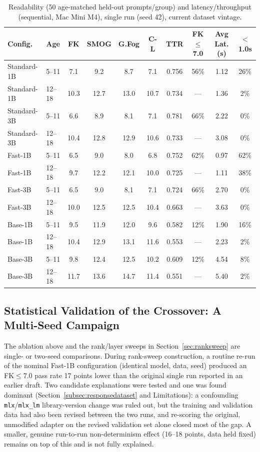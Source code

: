\documentclass[pdflatex,sn-mathphys-num]{sn-jnl}%
\begin{document}
\begin{table}[!h]
  \caption{Readability (50 age-matched held-out prompts/group) and latency/throughput (sequential, Mac Mini M4), single run (seed 42), current dataset vintage.}
  \label{tab:res2}
  \scriptsize
  \setlength{\tabcolsep}{3pt}
  \begin{tabular}{@{}llcccccccc@{}}
    \toprule
    Config. & Age & FK & SMOG & G.Fog & C-L & TTR & FK$\leq$7.0 & Avg Lat.(s) & $<$1.0s \\
    \midrule
    Standard-1B & 5--11  & 7.1  & 9.2  & 8.7  & 7.1  & 0.756 & 56\% & 1.12 & 26\% \\
    Standard-1B & 12--18 & 10.3 & 12.7 & 13.0 & 10.7 & 0.734 & ---  & 1.36 & 2\%  \\
    Standard-3B & 5--11  & 6.6  & 8.9  & 8.1  & 7.1  & 0.781 & 66\% & 2.22 & 0\%  \\
    Standard-3B & 12--18 & 10.4 & 12.8 & 12.9 & 10.6 & 0.733 & ---  & 3.08 & 0\%  \\
    Fast-1B     & 5--11  & 6.5  & 9.0  & 8.0  & 6.8  & 0.752 & 62\% & 0.97 & 62\% \\
    Fast-1B     & 12--18 & 9.7  & 12.2 & 12.1 & 10.0 & 0.725 & ---  & 1.11 & 38\% \\
    Fast-3B     & 5--11  & 6.5  & 9.0  & 8.1  & 7.1  & 0.724 & 66\% & 2.70 & 0\%  \\
    Fast-3B     & 12--18 & 10.0 & 12.5 & 12.5 & 10.4 & 0.663 & ---  & 3.63 & 0\%  \\
    Base-1B     & 5--11  & 9.5  & 11.9 & 12.0 & 9.6  & 0.582 & 12\% & 1.90 & 16\% \\
    Base-1B     & 12--18 & 10.4 & 12.9 & 13.1 & 11.6 & 0.553 & ---  & 2.23 & 2\%  \\
    Base-3B     & 5--11  & 9.8  & 12.4 & 12.5 & 10.2 & 0.609 & 12\% & 4.54 & 8\%  \\
    Base-3B     & 12--18 & 11.7 & 13.6 & 14.7 & 11.4 & 0.551 & ---  & 5.40 & 2\%  \\
    \bottomrule
  \end{tabular}
\end{table}

\subsection{Statistical Validation of the Crossover: A Multi-Seed Campaign}\label{sec:seedcampaign}

The ablation above and the rank/layer sweeps in Section~\ref{sec:ranksweep} are single- or two-seed comparisons. During rank-sweep construction, a routine re-run of the nominal Fast-1B configuration (identical model, data, seed) produced an FK$\leq$7.0 pass rate 17 points lower than the original single run reported in an earlier draft. Two candidate explanations were tested and one was found dominant (Section~\ref{subsec:responsedataset} and Limitations): a confounding \texttt{mlx}/\texttt{mlx\_lm} library-version change was ruled out, but the training and validation data had also been revised between the two runs, and re-scoring the original, unmodified adapter on the revised validation set alone closed most of the gap. A smaller, genuine run-to-run non-determinism effect (16--18 points, data held fixed) remains on top of this and is not fully explained.
\end{document}
